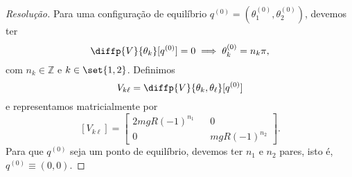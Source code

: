 \begin{proof}[Resolução]
    Para uma configuração de equilíbrio \(q^{(0)} = \left(\theta_1^{(0)}, \theta_2^{(0)}\right)\), devemos ter
    \begin{equation*}
        \diffp{V}{\theta_k}[q^{(0)}] = 0 \implies \theta^{(0)}_k = n_k\pi,
    \end{equation*}
    com \(n_k \in \mathbb{Z}\) e \(k \in \set{1,2}\). Definimos
    \begin{equation*}
        V_{k\ell} = \diffp{V}{\theta_k,\theta_\ell}[q^{(0)}]
    \end{equation*}
    e representamos matricialmente por
    \begin{equation*}
        \left[V_{k\ell}\right] = \begin{bmatrix}
            2mgR(-1)^{n_1} && 0\\
            0 && mgR(-1)^{n_2}
        \end{bmatrix}.
    \end{equation*}
    Para que \(q^{(0)}\) seja um ponto de equilíbrio, devemos ter \(n_1\) e \(n_2\) pares, isto é, \(q^{(0)} \equiv (0,0)\).


\end{proof}

